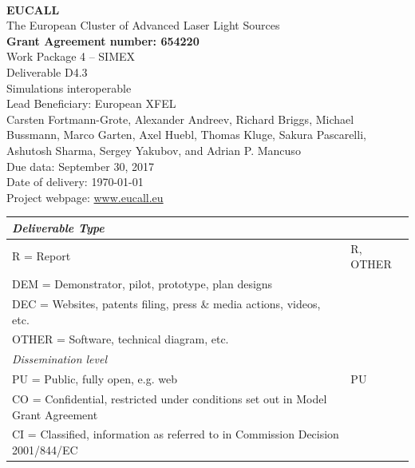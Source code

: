 \documentclass[10pt]{scrartcl}
\begin{document}
\makeatletter
\begin{titlepage}
\thispagestyle{scrheadings}
\begin{center}
$~$\\
\vspace{0cm}
{\Large\textbf{EUCALL}\\[2ex]
The European Cluster of Advanced Laser Light Sources}\\[4ex]
%
{\small\textbf{Grant Agreement number: 654220}}\\[8ex]
%
Work Package 4 -- SIMEX\\[4ex]
%
Deliverable D4.3\\
%
Simulations interoperable\\[5ex]
%
Lead Beneficiary: European XFEL\\[5ex]
%
Carsten Fortmann-Grote, Alexander Andreev, Richard Briggs, Michael Bussmann,
  Marco Garten, Axel Huebl, Thomas Kluge,
  Sakura Pascarelli, Ashutosh Sharma, Sergey Yakubov, and Adrian P. Mancuso\\[4ex]
%
Due data: September 30, 2017\\
Date of delivery: \today \\[4ex]
%
Project webpage: \url{www.eucall.eu}\\[6ex]
%
{%
\small
\begin{tabular}{|l|l|}
  \hline
  \multicolumn{2}{|l|}{ \textit{Deliverable Type} } \\
  \hline
  R = Report\hfill & R, OTHER \\
  DEM = Demonstrator, pilot, prototype, plan designs & \\
  DEC = Websites, patents filing, press \& media actions, videos, etc. & \\
  OTHER = Software, technical diagram, etc. & \\
  \hline
  \multicolumn{2}{|l|}{\textit{Dissemination level}} \\
  \hline
  PU = Public, fully open, e.g. web & PU \\
  CO = Confidential, restricted under conditions set out in Model Grant
  Agreement\hspace*{17ex}\  & \\
  CI = Classified, information as referred to in Commission Decision 2001/844/EC
  & \\
  \hline
\end{tabular}
}

\end{center}
%
{}
\normalfont
\end{titlepage}
\makeatother
\end{document}
